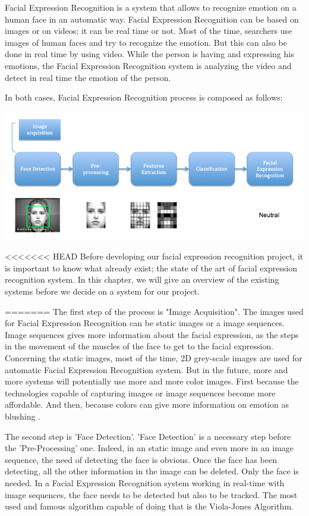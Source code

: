 \noindent Facial Expression Recognition is a system that allows to recognize emotion on a human face in an automatic way. Facial Expression Recognition can be based on images or on videos; it can be real time or not. Most of the time, searchers use images of human faces and try to recognize the emotion. But this can also be done in real time by using video. While the person is having and expressing his emotions, the Facial Expression Recognition system is analyzing the video and detect in real time the emotion of the person.
\newline

\noindent In both cases, Facial Expression Recognition process is composed as follows:


\noindent \includegraphics[scale=0.6]{figures/facial_expression_recognition_process}

<<<<<<< HEAD
\noindent Before developing our facial expression recognition project, it is important to know what already exist; the state of the art of facial expression recognition system. In this chapter, we will give an overview of the existing systems before we decide on a system for our project.


=======
The first step of the process is "Image Acquisition". The images used for Facial Expression Recognition can be static images or a image sequences. Image sequences gives more information about the facial expression, as the steps in the movement of the muscles of the face to get to the facial expression. Concerning the static images, most of the time, 2D grey-scale images are used for automatic Facial Expression Recognition system. But in the future, more and more systems will potentially use more and more color images. First because the technologies capable of capturing images or image sequences become more affordable. And then, because colors can give more information on emotion as blushing \cite{CHI03}.

The second step is 'Face Detection'. 'Face Detection' is a necessary step before the 'Pre-Processing' one. Indeed, in an static image and even more in an image sequence, the need of detecting the face is obvious. Once the face has been detecting, all the other information in the image can be deleted. Only the face is needed. In a Facial Expression Recognition system working in real-time with image sequences, the face needs to be detected but also to be tracked. The most used and famous algorithm capable of doing that is the Viola-Jones Algorithm.


